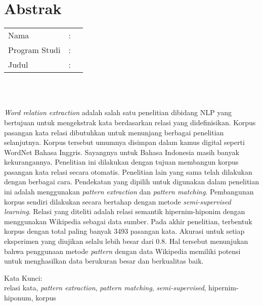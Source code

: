 %
%
%

\chapter*{Abstrak}

\vspace*{0.2cm}

\noindent \begin{tabular}{l l p{10cm}}
	Nama&: & \penulis \\
	Program Studi&: & \program \\
	Judul&: & \judul \\
\end{tabular} \\ 

\vspace*{0.5cm}

\noindent 
\\ \textit{Word relation extraction} adalah salah satu penelitian dibidang NLP yang bertujuan untuk mengekstrak kata berdasarkan relasi yang didefinisikan. Korpus pasangan kata relasi dibutuhkan untuk menunjang berbagai penelitian selanjutnya. Korpus tersebut umumnya disimpan dalam kamus digital seperti WordNet Bahasa Inggris. Sayangnya untuk Bahasa Indonesia masih banyak kekurangannya. Penelitian ini dilakukan dengan tujuan membangun korpus pasangan kata relasi secara otomatis. Penelitian lain yang sama telah dilakukan dengan berbagai cara. Pendekatan yang dipilih untuk digunakan dalam penelitian ini adalah menggunakan \textit{pattern extraction} dan \textit{pattern matching}. Pembangunan korpus sendiri dilakukan secara bertahap dengan metode \textit{semi-supervised learning}. Relasi yang diteliti adalah relasi semantik hipernim-hiponim dengan menggunakan Wikipedia sebagai data sumber. Pada akhir penelitian, terbentuk korpus dengan total paling banyak 3493 pasangan kata. Akurasi untuk setiap eksperimen yang diujikan selalu lebih besar dari 0.8. Hal tersebut menunjukan bahwa penggunaan metode \textit{pattern} dengan data Wikipedia memiliki potensi untuk menghasilkan data berukuran besar dan berkualitas baik.

\vspace*{0.2cm}

\noindent Kata Kunci: \\ 
\noindent relasi kata, \textit{pattern extraction}, \textit{pattern matching}, \textit{semi-supervised}, hipernim-hiponum, korpus\\ 

\newpage
